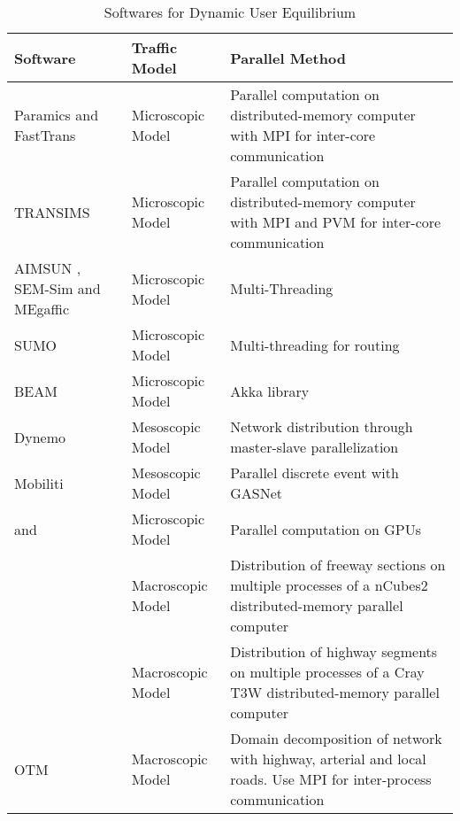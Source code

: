 \begin{table*}[htbp]
\centering
\begin{tabular} { | l | p{25mm} | p{80mm}| } 
	\hline
	\hline
	\textbf{Software} & \textbf{Traffic Model} & \textbf{Parallel Method}\\ \hline
	Paramics \cite{cameron1996paramics} and FastTrans \cite{thulasidasan2009accelerating}    & Microscopic Model & Parallel computation on distributed-memory computer with MPI for inter-core communication \\ \hline
	TRANSIMS \cite{robertson1969transyt}     & Microscopic Model & Parallel computation on distributed-memory computer with MPI and PVM for inter-core communication \\ \hline
	AIMSUN \cite{ferrer1993aimsun2}, SEM-Sim \cite{aydt2013multi} and MEgaffic \cite{osogami2012research}     & Microscopic Model & Multi-Threading \\ \hline
	SUMO \cite{behrisch2011sumo}    & Microscopic Model & Multi-threading for routing \\ \hline
	BEAM \cite{aboutBeam}    & Microscopic Model & Akka library \\ \hline
	Dynemo \cite{nokel2002parallel}  & Mesoscopic Model & Network distribution through master-slave parallelization \\ \hline
	Mobiliti \cite{chan2018mobiliti}     & Mesoscopic Model & Parallel discrete event with GASNet \\ \hline
	\cite{xu2014mesoscopic,song2017supporting}and \cite{strippgen2009multi}     & Microscopic Model & Parallel computation on GPUs \\ \hline
	\cite{chronopoulos1998real}     & Macroscopic Model & Distribution of freeway sections on multiple processes of a nCubes2 distributed-memory parallel computer \\ \hline
	\cite{johnston1999parallelization}     & Macroscopic Model & Distribution of highway segments on multiple processes of a Cray T3W distributed-memory parallel computer \\ \hline
	OTM     & Macroscopic Model & Domain decomposition of network with highway, arterial and local roads. Use MPI for inter-process communication \\ \hline
\end{tabular}
\caption{Softwares for Dynamic User Equilibrium}
\label{tab:softwares}
\end{table*}



